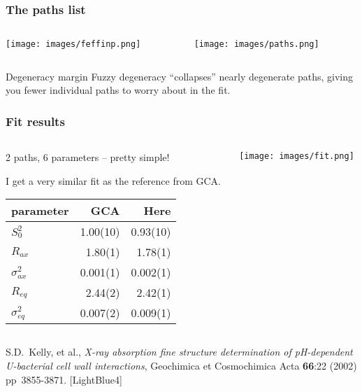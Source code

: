 \documentclass[10pt, xcolor=x11names, compress]{beamer}
\begin{document}
\begin{frame}
  \frametitle{The paths list}
  \begin{columns}[T]
    \begin{column}{0.5\linewidth}
      \begin{center}
        \texttt{[image: images/feffinp.png]}
      \end{center}
    \end{column}
    \begin{column}{0.5\linewidth}
      \begin{center}
        \texttt{[image: images/paths.png]}
      \end{center}
    \end{column}
  \end{columns}
  \begin{block}{Degeneracy margin}
    Fuzzy degeneracy ``collapses'' nearly degenerate paths, giving you
    fewer individual paths to worry about in the fit.
  \end{block}
\end{frame}

\begin{frame}
  \frametitle{Fit results}
  \begin{columns}[T]
    \begin{column}{0.5\linewidth}
      2 paths, 6 parameters -- pretty simple!

      \bigskip

      I get a very similar fit as the reference from GCA.

      \bigskip

      \begin{tabular}{lrr}
        \small parameter & GCA & Here \\
        \hline
        $S_0^2$         &   1.00(10) & 0.93(10) \\
        $R_{ax}$        &  1.80(1) & 1.78(1) \\
        $\sigma^2_{ax}$ &  0.001(1) & 0.002(1) \\
        $R_{eq}$        &  2.44(2) & 2.42(1) \\
        $\sigma^2_{eq}$ &  0.007(2) & 0.009(1) \\
      \end{tabular}
    \end{column}
    \begin{column}{0.5\linewidth}
      \texttt{[image: images/fit.png]}
    \end{column}
  \end{columns}
  \begin{bottomnote}[0.7][19.0]
    S.D.\ Kelly, et al., \textit{X-ray absorption fine structure
      determination of pH-dependent U-bacterial cell wall
      interactions}, Geochimica et Cosmochimica Acta \textbf{66}:22
    (2002) pp\  3855-3871.
    [LightBlue4]
  \end{bottomnote}
\end{frame}
\end{document}
